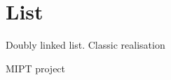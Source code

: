 \chapter{List}
\hypertarget{index}{}\label{index}
\label{index_md__r_e_a_d_m_e}%
%
 Doubly linked list. Classic realisation

MIPT project 